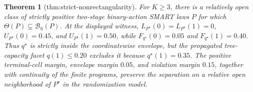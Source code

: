 \documentclass{article}
\newtheorem{theorem}{Theorem}
\begin{document}
\begin{theorem}[thm:strict-nonrectangularity]\label{thm:strict-nonrectangularity}
For \(K\geq3\), there is a relatively open class of strictly positive two-stage binary-action SMART laws \(P\) for which \(\Theta(P)\subsetneq\mathcal B_{\mathrm S}(P)\). At the displayed witness, \(L_{P^\star}(0)=L_{P^\star}(1)=0\), \(U_{P^\star}(0)=0.45\), and \(U_{P^\star}(1)=0.50\), while \(F_{q^\star}(0)=0.05\) and \(F_{q^\star}(1)=0.40\). Thus \(q^\star\) is strictly inside the coordinatewise envelope, but the propagated tree-capacity facet \(q(1)\leq0.20\) excludes it because \(q^\star(1)=0.35\). The positive terminal-cell margin, envelope margin \(0.05\), and violation margin \(0.15\), together with continuity of the finite programs, preserve the separation on a relative open neighborhood of \(P^\star\) in the randomization model.
\end{theorem}
\end{document}
